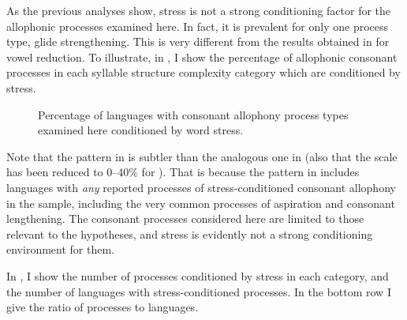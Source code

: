   As the previous analyses show, stress is not a strong conditioning factor for the allophonic processes examined here. In fact, it is prevalent for only one process type, glide strengthening. This is very different from the results obtained in  for vowel reduction. To illustrate, in , I show the percentage of allophonic consonant processes in each syllable structure complexity category which are conditioned by stress.

  
\begin{figure}[H]
\caption{\label{fig:7.11}Percentage of languages with consonant allophony process types examined here conditioned by word stress.}
\end{figure}

  Note that the pattern in  is subtler than the analogous one in  (also that the scale has been reduced to 0--40\% for ). That is because the pattern in  includes languages with \textit{any} reported processes of stress-conditioned consonant allophony in the sample, including the very common processes of aspiration and consonant lengthening. The consonant processes considered here are limited to those relevant to the hypotheses, and stress is evidently not a strong conditioning environment for them.

  In , I show the number of processes conditioned by stress in each category, and the number of languages with stress-conditioned processes. In the bottom row I give the ratio of processes to languages.

